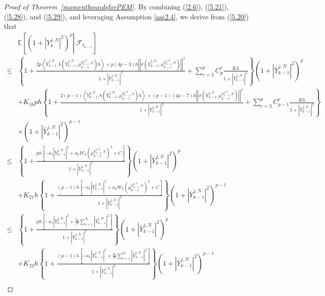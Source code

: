 \documentclass[12pt]{article}
\numberwithin{equation}{section}
\begin{document}
\begin{proof}[Proof of Theorem~\ref{momentboundsforPEM}]
By combining (\ref{2.6}), (\ref{5.21}), (\ref{5.28}), and (\ref{5.29}), and  leveraging Assumption \ref{ass2.4}, we derive from (\ref{5.20}) that 
\begin{equation}\tag{5.80}\label{5.33}
\begin{aligned}
	&\mathbb{E} \left[ \left.\left( 1+\left| Y_{k}^{j,N} \right|^2 \right) ^p \right\rvert\ \mathcal{F} _{t_{k-1}}\right]\\
	\le & \left\{ 1+\tfrac{2p\left.\left \langle \bar{Y}_{k-1}^{j,N},b\left( \bar{Y}_{k-1}^{j,N},\mu _{k-1}^{\bar{Y}_{k-1}^{j,N},N} \right) h \right.\right \rangle +p\left(4p-3\right)h\left|\left| \sigma \left( \bar{Y}_{k-1}^{j,N},\mu _{k-1}^{\bar{Y}_{k-1}^{j,N},N} \right) \right|\right| ^2}{1+\left| \bar{Y}_{k-1}^{j,N} \right|^2} +\sum_{r=3}^p{C_{p}^{r} \tfrac{Kh}{1+\left|\bar{Y}_{k-1}^{j,N}\right|^2}}\right\} \left( 1+\left| \bar{Y}_{k-1}^{j,N} \right|^2 \right) ^p \\
	&+K_{16}ph\left\{ 1+\tfrac{2\left(p-1\right)\left.\left \langle \bar{Y}_{k-1}^{j,N},b\left( \bar{Y}_{k-1}^{j,N},\mu _{k-1}^{\bar{Y}_{k-1}^{j,N},N} \right) h \right.\right \rangle +\left(p-1\right)\left(4p-7\right)h\left|\left| \sigma \left( \bar{Y}_{k-1}^{j,N},\mu _{k-1}^{\bar{Y}_{k-1}^{j,N},N} \right) \right|\right| ^2}{1+\left| \bar{Y}_{k-1}^{j,N} \right|^2} +\sum_{r=3}^p{C_{p-1}^{r} \tfrac{Kh}{1+\left|\bar{Y}_{k-1}^{j,N}\right|^2}}\right\}\\
    &\times\left( 1+\left| \bar{Y}_{k-1}^{j,N} \right|^2 \right) ^{p-1}\\
	\le&  \left\{ 1+\tfrac{ph\left[ -a_1\left| \bar{Y}_{k-1}^{j,N} \right|^2+a_2\mathcal{W} _2\left( \mu _{k-1}^{\bar{Y}_{k-1}^{j,N},N} \right) ^2+C \right]}{1+\left| \bar{Y}_{k-1}^{j,N} \right|^2} \right\} \left( 1+\left| \bar{Y}_{k-1}^{j,N} \right|^2 \right) ^p \\
	&+K_{21}h\left\{ 1+\tfrac{\left(p-1\right)h\left[ -a_1\left| \bar{Y}_{k-1}^{j,N} \right|^2+a_2\mathcal{W} _2\left( \mu _{k-1}^{\bar{Y}_{k-1}^{j,N},N} \right) ^2+C \right]}{1+\left| \bar{Y}_{k-1}^{j,N} \right|^2} \right\} \left( 1+\left| \bar{Y}_{k-1}^{j,N} \right|^2 \right) ^{p-1} \\
	\leq&  \left\{ 1+\tfrac{ph\left[ -a_1\left| \bar{Y}_{k-1}^{j,N} \right|^2+\tfrac{a_2}{N}\sum_{i=1}^N{\left|\bar{Y}_{k-1}^{i,N}\right|^2}\right]}{1+\left| \bar{Y}_{k-1}^{j,N} \right|^2} \right\} \left( 1+\left| \bar{Y}_{k-1}^{j,N} \right|^2 \right) ^p \\
	&+K_{22}h \left\{ 1+\tfrac{\left(p-1\right)h\left[ -a_1\left| \bar{Y}_{k-1}^{j,N} \right|^2+\tfrac{a_2}{N}\sum_{i=1}^N{\left|\bar{Y}_{k-1}^{i,N}\right|^2}\right]}{1+\left| \bar{Y}_{k-1}^{j,N} \right|^2} \right\} \left( 1+\left| \bar{Y}_{k-1}^{j,N} \right|^2 \right) ^{p-1} \\

\end{aligned}
\end{equation}
\end{proof}
\end{document}
